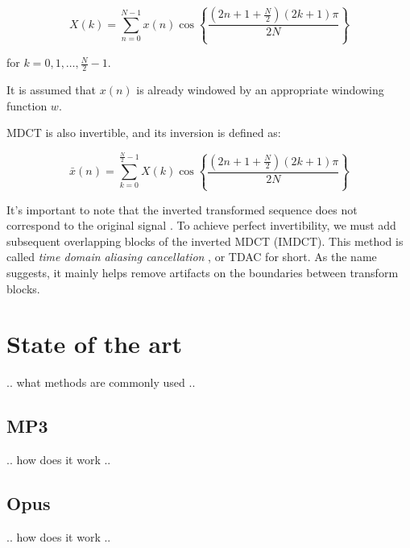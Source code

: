 $$X(k) = \sum_{n=0}^{N-1} x(n) \cos \left\lbrace \frac{(2n+1+ \frac{N}{2} )(2k+1)\pi }{2N} \right\rbrace$$ 

for $k = 0, 1, \ldots, \frac{N}{2}-1$.

It is assumed that $x(n)$ is already windowed by an appropriate windowing function $w$.

MDCT is also invertible, and its inversion is defined as:

$$\bar{x}(n) = \sum_{k=0}^{\frac{N}{2}-1} X(k) \cos \left\lbrace \frac{(2n+1+ \frac{N}{2} )(2k+1)\pi }{2N} \right\rbrace$$

It's important to note that the inverted transformed sequence does not correspond to the original signal \cite{prince_1986_tdac_1}. To achieve perfect invertibility, we must add subsequent overlapping blocks of the inverted MDCT (IMDCT). This method is called \emph{time domain aliasing cancellation} \cite{prince_1986_tdac_2}, or TDAC for short. As the name suggests, it mainly helps remove artifacts on the boundaries between transform blocks.

\section{State of the art}
.. what methods are commonly used ..

\subsection{MP3}
.. how does it work ..

\subsection{Opus}
.. how does it work ..


